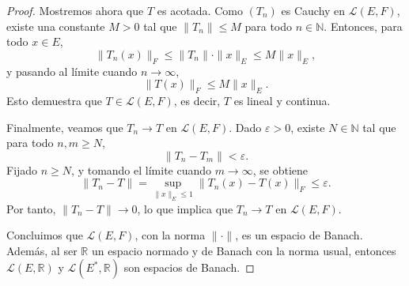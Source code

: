 \begin{proof}
Mostremos ahora que \( T \) es acotada. Como \( (T_n) \) es Cauchy en \( \mathcal{L}(E, F) \), existe una constante \( M > 0 \) tal que \( \|T_n\| \leq M \) para todo \( n \in \mathbb{N} \). Entonces, para todo \( x \in E \),
\[
\|T_n(x)\|_F \leq \|T_n\| \cdot \|x\|_E \leq M \|x\|_E,
\]
y pasando al límite cuando \( n \to \infty \),
\[
\|T(x)\|_F \leq M \|x\|_E.
\]
Esto demuestra que \( T \in \mathcal{L}(E, F) \), es decir, \( T \) es lineal y continua.

Finalmente, veamos que \( T_n \to T \) en \( \mathcal{L}(E, F) \). Dado \( \varepsilon > 0 \), existe \( N \in \mathbb{N} \) tal que para todo \( n, m \geq N \),
\[
\|T_n - T_m\| < \varepsilon.
\]
Fijado \( n \geq N \), y tomando el límite cuando \( m \to \infty \), se obtiene
\[
\|T_n - T\| = \sup_{\|x\|_E \leq 1} \|T_n(x) - T(x)\|_F \leq \varepsilon.
\]
Por tanto, \( \|T_n - T\| \to 0 \), lo que implica que \( T_n \to T \) en \( \mathcal{L}(E, F) \).

\medskip

Concluimos que \( \mathcal{L}(E, F) \), con la norma \( \|\cdot\| \), es un espacio de Banach. Además, al ser $\mathbb{R}$ un espacio normado y de Banach con la norma usual, entonces \( \mathcal{L}(E, \mathbb{R}) \) y \( \mathcal{L}(E^{*}, \mathbb{R}) \) son espacios de Banach.
\end{proof}
